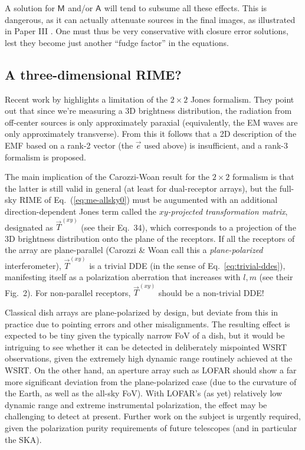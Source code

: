 \documentclass{aa}
\newcommand{\jones}[2]{\vec {#1}_{#2}}
\newcommand{\coh}[2]{\mathsf{{#1}}_{{#2}}}
\begin{document}
A solution for $\coh{M}{}$ and/or $\coh{A}{}$ will tend to subsume all these effects. This is dangerous, as it can actually attenuate sources in the final images, as illustrated in Paper III \citep[Sect.~1.5]{RRIME3}. One must thus be very conservative with closure error solutions, lest they become just another ``fudge factor'' in the equations.

\subsection{A three-dimensional RIME?\label{sec:3D-rime}}

Recent work by \citet{Carozzi:ME3D} highlights a limitation of the $2\times2$ Jones formalism. They point out that 
since we're measuring a 3D brightness distribution, the radiation from off-center sources is only approximately paraxial (equivalently, the EM waves are only approximately transverse). From this it follows that a 2D description of the EMF 
based on a rank-2  vector (the $\vec e$ used above) is insufficient, and a rank-3 formalism is proposed. 

The main implication of the Carozzi-Woan result for the $2\times2$ formalism is that the latter is still valid in general (at least for dual-receptor arrays), but the full-sky RIME of Eq.~(\ref{eq:me-allsky0}) must be augumented with an additional direction-dependent Jones term called the \emph{$xy$-projected transformation matrix}, designated as $\jones{T}{}^{(xy)}$ (see their Eq.~34), which corresponds to a projection of the 3D brightness distribution onto the plane of the receptors. If all the receptors of the array are plane-parallel (Carozzi \& Woan call this a {\em plane-polarized} interferometer), $\jones{T}{}^{(xy)}$ is a trivial DDE (in the sense of Eq.~\ref{eq:trivial-ddes}), manifesting itself as a polarization aberration that increases with $l,m$ (see their Fig.~2). For non-parallel receptors, $\jones{T}{}^{(xy)}$ should be a non-trivial DDE!

Classical dish arrays are plane-polarized by design, but deviate from this in practice due to pointing errors and other misalignments. The resulting effect is expected to be tiny given the typically narrow FoV of a dish, but it would be intriguing to see whether it can be detected in deliberately mispointed WSRT observations, given the extremely high dynamic range routinely achieved at the WSRT. On the other hand, an aperture array such as LOFAR should show a far more significant deviation from the plane-polarized case (due to the curvature of the Earth, as well as the all-sky FoV). With LOFAR's (as yet) relatively low dynamic range and extreme instrumental polarization, the effect may be challenging to detect at present. Further work on the subject is urgently required, given the polarization purity requirements of future telescopes (and in particular the SKA).
\end{document}
